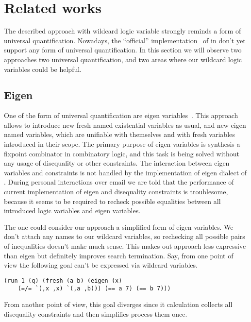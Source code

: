 

\section{Related works}
\label{sec:related}

The described approach with wildcard logic variable
strongly reminds a form of universal quantification. 
Nowadays, the ``official'' implementation~\cite{fasterMK} of \miniKanren{} in \Scheme{} don't yet support any form of universal quantification. In this section we will observe two approaches two universal quantification, and two areas where our wildcard logic variables could be helpful.

\subsection{Eigen}

One of the form of universal quantification are eigen variables~\cite{eigen}. This approach allows to introduce new fresh named existential variables as usual, and new eigen named variables, which are unifiable with themselves and with fresh variables introduced in their scope. The primary purpose of eigen variables is synthesis a fixpoint combinator in combinatory logic, and this task is being solved without any usage of disequality or other constraints. The interaction between eigen variables and constraints is not handled by the implementation of eigen dialect of \miniKanren{}. During personal interactions over email we are told that the performance of current implementation of eigen and disequality constraints is troublesome, because it seems to be required to recheck possible equalities between all introduced logic variables and eigen variables. 

The one could consider our approach a simplified form of eigen variables. 
We don't attach any names to our wildcard variables, so rechecking all possible pairs of inequalities doesn't make much sense.
This makes out approach less expressive than eigen but definitely improves search termination.  
Say, from one point of view the following goal can't be expressed via wildcard variables.
\begin{lstlisting}[language=ocanren]
(run 1 (q) (fresh (a b) (eigen (x) 
    (=/= `(,x ,x) `(,a ,b))) (== a 7) (== b 7)))
\end{lstlisting}
From another point of view, this goal diverges since it calculation collects all disequality constraints and then simplifies process them once.

